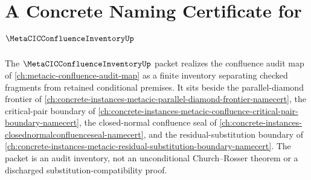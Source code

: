 \chapter{A Concrete Naming Certificate for $\MetaCICConfluenceInventoryUp$}
\label{ch:concrete-instances-metacic-confluence-inventory-namecert}

The $\MetaCICConfluenceInventoryUp$ packet realizes the confluence audit map of \autoref{ch:metacic-confluence-audit-map} as a finite inventory separating checked fragments from retained conditional premises. It sits beside the parallel-diamond frontier of \autoref{ch:concrete-instances-metacic-parallel-diamond-frontier-namecert}, the critical-pair boundary of \autoref{ch:concrete-instances-metacic-confluence-critical-pair-boundary-namecert}, the closed-normal confluence seal of \autoref{ch:concrete-instances-closednormalconfluenceseal-namecert}, and the residual-substitution boundary of \autoref{ch:concrete-instances-metacic-residual-substitution-boundary-namecert}. The packet is an audit inventory, not an unconditional Church--Rosser theorem or a discharged substitution-compatibility proof.

